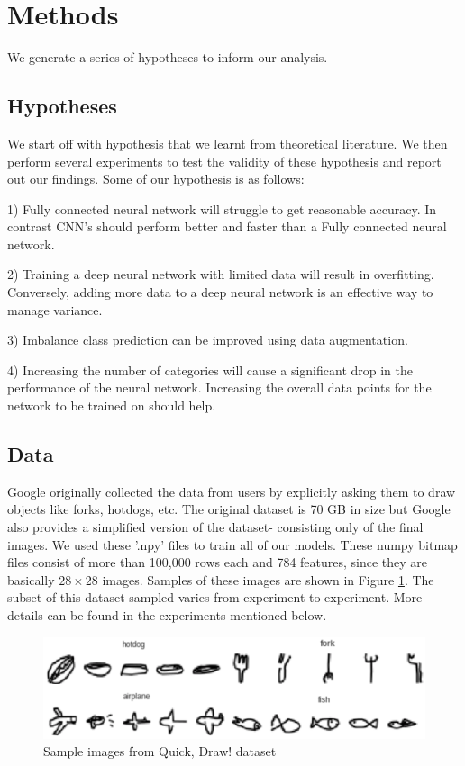 \documentclass[12pt]{article}
\begin{document}
\section{Methods}

We generate a series of hypotheses to inform our analysis.

\subsection{Hypotheses}

We start off with hypothesis that we learnt from theoretical literature. We
then perform several experiments to test the validity of these hypothesis and
report out our findings. Some of our hypothesis is as follows:

1) Fully connected neural network will struggle to get reasonable accuracy.
In contrast CNN’s should perform better and faster than a Fully connected
neural network.

2) Training a deep neural network with limited data will result in
overfitting. Conversely, adding more data to a deep neural network is an
effective way to manage variance.

3) Imbalance class prediction can be improved using data augmentation.

4) Increasing the number of categories will cause a significant drop in the
performance of the neural network. Increasing the overall data points for the
network to be trained on should help. 


\subsection{Data}

Google originally collected the data from users by explicitly asking them to
draw objects like forks, hotdogs, etc. The original dataset is 70 GB in size
but Google also provides a simplified version of the dataset- consisting only
of the final images. We used these '.npy' files to train all of our models.
These numpy bitmap files consist of more than 100,000 rows each and 784
features, since they are basically $28 \times 28$ images. Samples of these
images are shown in Figure \ref{fig:quickImages}. The subset of this
dataset sampled varies from experiment to experiment. More details can be
found in the experiments mentioned below.

\begin{figure}[h]
  \begin{center}
    \includegraphics[scale=0.5]{fig1}
  \end{center}
  \caption{Sample images from Quick, Draw! dataset}
  \label{fig:quickImages}
  \end{figure}
\end{document}
